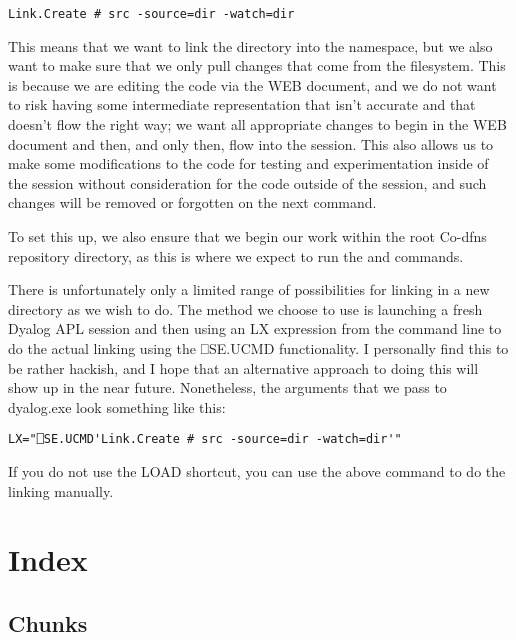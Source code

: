 \documentclass{article}%
\begin{document}
\begin{verbatim}
Link.Create # src -source=dir -watch=dir
\end{verbatim}

\noindent
This means that we want to link the {\Tt{}\nwendquote} directory into the {\Tt{}{\#}\nwendquote}
namespace,
but we also want to make sure that we only pull changes that come
from the filesystem.
This is because we are editing the code via the WEB document,
and we do not want to risk having some intermediate representation
that isn't accurate and that doesn't flow the right way;
we want all appropriate changes to begin in the WEB document
and then, and only then, flow into the session.
This also allows us to make some modifications to the code for testing
and experimentation inside of the session without consideration
for the code outside of the session,
and such changes will be removed or forgotten on the next {\Tt{}\nwendquote}
command.

To set this up, we also ensure that we begin our work within the
root Co-dfns repository directory, as this is where we expect to run
the {\Tt{}\nwendquote} and {\Tt{}\nwendquote} commands.

There is unfortunately only a limited range of possibilities for
linking in a new directory as we wish to do.
The method we choose to use is launching a fresh Dyalog APL session
and then using an {\Tt{}LX\nwendquote} expression from the command line
to do the actual linking using the {\Tt{}⎕SE.UCMD\nwendquote} functionality.
I personally find this to be rather hackish, and I hope that an
alternative approach to doing this will show up in the near future.
Nonetheless, the arguments that we pass to {\Tt{}dyalog.exe\nwendquote}
look something like this:

\begin{verbatim}
LX="⎕SE.UCMD'Link.Create # src -source=dir -watch=dir'"
\end{verbatim}

If you do not use the {\Tt{}LOAD\nwendquote} shortcut, you can use the above
command to do the linking manually.

\section{Index}

\subsection{Chunks}
\end{document}
